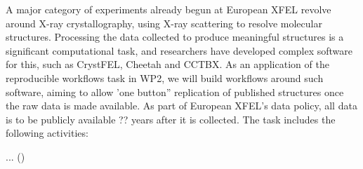 \begin{task}[
  title=Reproducible X-ray crystallography workflows at European XFEL,
  id=reproducibility-euxfel,
  lead=XFEL,
  PM=36,
  wphases={6-48},
  partners={XFEL}
  ]
  A major category of experiments already begun at European XFEL revolve around
  X-ray crystallography, using X-ray scattering to resolve molecular structures.
  Processing the data collected to produce meaningful structures is a
  significant computational task, and researchers have developed complex
  software for this, such as CrystFEL, Cheetah and CCTBX.
  As an application of the reproducible workflows task in WP2, we will build
  workflows around such software, aiming to allow 'one button'' replication
  of published structures once the raw data is made available.
  As part of European XFEL's data policy, all data is to be publicly available
  ?? years after it is collected.
  The task includes the following activities:
  \begin{compactitem}
  \item ...
    ()
  \end{compactitem}


\end{task}
